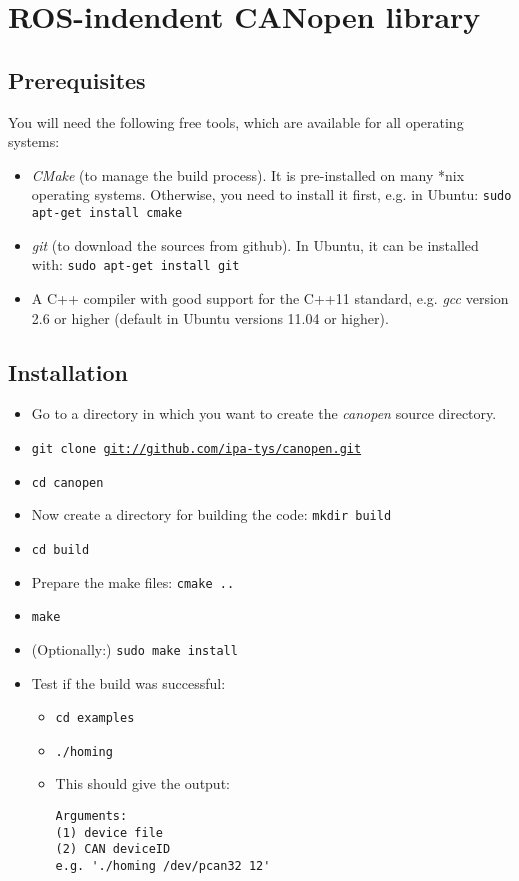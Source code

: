  \section{ROS-indendent CANopen library}

\subsection{Prerequisites}

You will need the following free tools, which are available for all operating systems:
\begin{itemize}
\item {\em CMake} (to manage the build process). It is pre-installed on many *nix operating systems. Otherwise, you need to install it first, e.g. in Ubuntu:
\texttt{sudo apt-get install cmake}
\item {\em git} (to download the sources from github). In Ubuntu, it can be installed with: \texttt{sudo apt-get install git}
\item A C++ compiler with good support for the C++11 standard, e.g. {\em gcc} version 2.6 or higher (default in Ubuntu versions 11.04 or higher).
\end{itemize}

\subsection{Installation}

\begin{itemize}
\item Go to a directory in which you want to create the {\em canopen} source directory.
\item \texttt{git clone \url{git://github.com/ipa-tys/canopen.git}}
\item \texttt{cd canopen}
\item Now create a directory for building the code: \texttt{mkdir build}
\item \texttt{cd build}
\item Prepare the make files: \texttt{cmake ..}
\item \texttt{make}
\item (Optionally:) \texttt{sudo make install}
\item Test if the build was successful:
\begin{itemize} 
\item \texttt{cd examples}
\item \texttt{./homing}
\item This should give the output:
{\scriptsize
\begin{verbatim}
Arguments:
(1) device file
(2) CAN deviceID
e.g. './homing /dev/pcan32 12'
\end{verbatim}}
\end{itemize}
\end{itemize}

